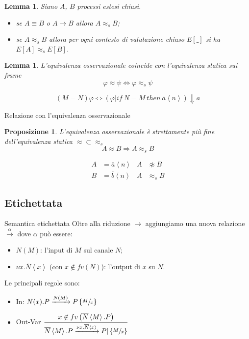 \documentclass{beamer}
\newcounter{counter1}
\theoremstyle{plain}
\newtheorem{mylem}[counter1]{Lemma}
\newtheorem{mypro}[counter1]{Proposizione}
\theoremstyle{definition}
\theoremstyle{remark}
\newcommand{\obar}[1]{\overline{#1}}
\newcommand{\set}[1]{\left\{#1\right\}}
\newcommand{\pa}[1]{\left(#1\right)}
\newcommand{\ang}[1]{\left<#1\right>}
\begin{document}
\begin{frame}
  \begin{mylem}
    Siano $A$, $B$ processi estesi chiusi.
    \begin{itemize}
    \item se $A \equiv B$ o $A \rightarrow B$ allora $A \approx _s B$;
    \item se $A \approx _s B$ allora per ogni contesto di valutazione
      chiuso $E[\_]$ si ha $E[A] \approx _s E[B]$.
    \end{itemize}
  \end{mylem}
  \vfill
  
  \begin{mylem}
    L'equivalenza osservazionale coincide con l'equivalenza statica
    sui frame
    \[ \varphi \approx \psi \Leftrightarrow \varphi \approx _s \psi \]
  \end{mylem}
  \[ (M=N)\varphi \Leftrightarrow \pa{ \varphi | if\ N=M\ then\
      \obar{a}\ang{n}} \Downarrow a \]
\end{frame}
\begin{frame}{Relazione con l'equivalenza osservazionale}
  \begin{mypro}
    L'equivalenza osservazionale \`e strettamente pi\`u fine
    dell'equivalenza statica $\approx \subset \approx _s$
    \[ A \approx B \Rightarrow A \approx _s B \]
  \end{mypro}
  \vfill

  \begin{align*}
    A &= \obar{a}\ang{n} & A &\not\approx B \\
    B &= \obar{b}\ang{n} & A &\approx _s B 
  \end{align*}
\end{frame}

\subsection{Etichettata}

\begin{frame}{Semantica etichettata}
  Oltre alla riduzione $\rightarrow$ aggiungiamo una nuova relazione
  $\xrightarrow{\alpha}$ dove $\alpha$ pu\`o essere:
  \begin{itemize}
  \item $N(M)$: l'input di $M$ sul canale $N$;
  \item $\nu x.\obar{N}\ang{x}$ (con $x\not\in fv(N)$): l'output di
    $x$ su $N$.
  \end{itemize}
  
  Le principali regole sono:
  \begin{itemize}
  \item In: \( N(x).P \xrightarrow{N(M)} P\set{\sfrac{M}{x}} \)
  \item Out-Var \( \displaystyle \frac{x\not\in
      fv\pa{\obar{N}\ang{M}.P}}{\obar{N}\ang{M}.P \xrightarrow{\nu
        x.\obar{N}\ang{x}} P|\set{\sfrac{M}{x}}} \)
  \end{itemize}

\end{frame}
\end{document}
